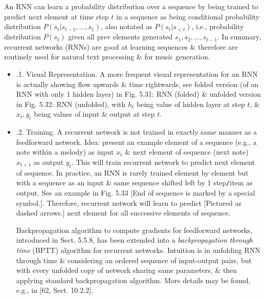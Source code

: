 \documentclass{article}
\begin{document}
\begin{itemize}
\begin{itemize}
		An RNN can learn a probability distribution over a sequence by being trained to predict next element at time step $t$ in a sequence as being conditional probability distribution $P(s_t|s_{t-1},\ldots,s_1)$, also notated as $P(s_t|s_{< t})$, i.e., probability distribution $P(s_t)$ given all prev elements generated $s_1,s_2,\ldots,s_{t-1}$. In summary, recurrent networks (RNNs) are good at learning sequences \& therefore are routinely used for natural text processing \& for music generation.
		\begin{itemize}
			\item {.1. Visual Representation.} A more frequent visual representation for an RNN is actually showing flow upwards \& time rightwards, see folded version (of an RNN with only 1 hidden layer) in {\sf Fig. 5.31: RNN (folded)} \& unfolded version in {\sf Fig. 5.32: RNN (unfolded)}, with $h_t$ being value of hidden layer at step $t$, \& $x_t,y_t$ being values of input \& output at step $t$.
			\item {.2. Training.} A recurrent network is not trained in exactly same manner as a feedforward network. Idea: present an example element of a sequence (e.g., a note within a melody) as input $x_t$ \& next element of sequence (next note) $x_{t+1}$ as output $y_t$. This will train recurrent network to predict next element of sequence. In practice, an RNN is rarely trained element by element but with a sequence as an input \& same sequence shifted left by 1 step{\tt/}item as output. See an example in {\sf Fig. 5.33} [End of sequence is marked by a special symbol.]. Therefore, recurrent network will learn to predict [Pictured as dashed arrows.] next element for all successive elements of sequence.
			
			Backpropagation algorithm to compute gradients for feedforward networks, introduced in Sect. 5.5.8, has been extended into a {\it backpropagation through time} (BPTT) algorithm for recurrent networks. Intuition is in unfolding RNN through time \& considering an ordered sequence of input-output pairs, but with every unfolded copy of network sharing same parameters, \& then applying standard backpropagation algorithm. More details may be found, e.g., in [62, Sect. 10.2.2].
			

\end{itemize}
\end{itemize}
\end{itemize}
\end{document}
